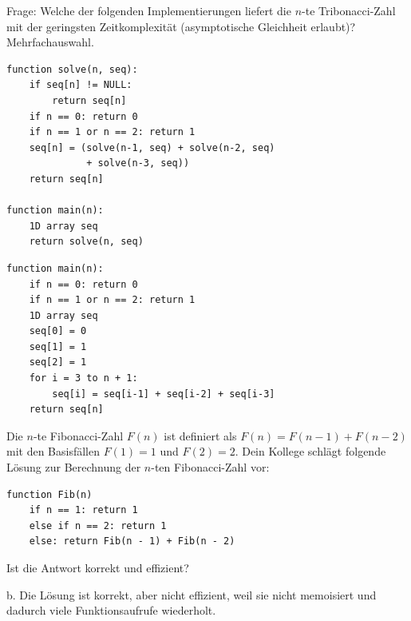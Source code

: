 \begin{contentbox}
Frage: Welche der folgenden Implementierungen liefert die $n$-te Tribonacci-Zahl mit der geringsten Zeitkomplexität (asymptotische Gleichheit erlaubt)? Mehrfachauswahl.
\end{contentbox}
\begin{codebox}
\begin{lstlisting}[style=CodeExpert]
function solve(n, seq):
    if seq[n] != NULL:
        return seq[n]
    if n == 0: return 0
    if n == 1 or n == 2: return 1
    seq[n] = (solve(n-1, seq) + solve(n-2, seq)
              + solve(n-3, seq))
    return seq[n]

function main(n):
    1D array seq
    return solve(n, seq)
\end{lstlisting}
\end{codebox}
\begin{codebox}
\begin{lstlisting}[style=CodeExpert]
function main(n):
    if n == 0: return 0
    if n == 1 or n == 2: return 1
    1D array seq
    seq[0] = 0
    seq[1] = 1
    seq[2] = 1
    for i = 3 to n + 1:
        seq[i] = seq[i-1] + seq[i-2] + seq[i-3]
    return seq[n]
\end{lstlisting}
\end{codebox}
\begin{contentbox}
Die $n$-te Fibonacci-Zahl $F(n)$ ist definiert als $F(n) = F(n-1) + F(n-2)$ mit den Basisfällen $F(1) = 1$ und $F(2) = 2$. Dein Kollege schlägt folgende Lösung zur Berechnung der $n$-ten Fibonacci-Zahl vor:
\end{contentbox}
\begin{codebox}
\begin{lstlisting}[style=CodeExpert]
function Fib(n)
    if n == 1: return 1
    else if n == 2: return 1
    else: return Fib(n - 1) + Fib(n - 2)
\end{lstlisting}
\end{codebox}
\begin{contentbox}
Ist die Antwort korrekt und effizient?
\begin{factlist}
    \item b. Die Lösung ist korrekt, aber nicht effizient, weil sie nicht memoisiert und dadurch viele Funktionsaufrufe wiederholt.
\end{factlist}
\end{contentbox}

